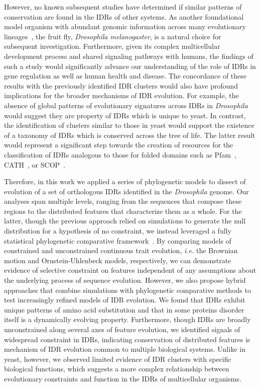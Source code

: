 However, no known subsequent studies have determined if similar patterns of conservation are found in the IDRs of other systems. As another foundational model organism with abundant genomic information across many evolutionary lineages~\cite{Yang2018, Miller2018, Kim2021, Gramates2022}, the fruit fly, \textit{Drosophila melanogaster}, is a natural choice for subsequent investigation. Furthermore, given its complex multicellular development process and shared signaling pathways with humans, the findings of such a study would significantly advance our understanding of the role of IDRs in gene regulation as well as human health and disease. The concordance of these results with the previously identified IDR clusters would also have profound implications for the broader mechanisms of IDR evolution. For example, the absence of global patterns of evolutionary signatures across IDRs in \textit{Drosophila} would suggest they are property of IDRs which is unique to yeast. In contrast, the identification of clusters similar to those in yeast would support the existence of a taxonomy of IDRs which is conserved across the tree of life. The latter result would represent a significant step towards the creation of resources for the classification of IDRs analogous to those for folded domains such as Pfam~\cite{Mistry2020}, CATH~\cite{Sillitoe2020}, or SCOP~\cite{Andreeva2013, Andreeva2019}.

Therefore, in this work we applied a series of phylogenetic models to dissect of evolution of a set of orthologous IDRs identified in the \textit{Drosophila} genome. Our analyses span multiple levels, ranging from the sequences that compose these regions to the distributed features that characterize them as a whole. For the latter, though the previous approach relied on simulations to generate the null distribution for a hypothesis of no constraint, we instead leveraged a fully statistical phylogenetic comparative framework~\cite{Cornwell2017}. By comparing models of constrained and unconstrained continuous trait evolution, \textit{i.e.} the Brownian motion and Ornstein-Uhlenbeck models, respectively, we can demonstrate evidence of selective constraint on features independent of any assumptions about the underlying process of sequence evolution. However, we also propose hybrid approaches that combine simulations with phylogenetic comparative methods to test increasingly refined models of IDR evolution. We found that IDRs exhibit unique patterns of amino acid substitution and that in some proteins disorder itself is a dynamically evolving property. Furthermore, though IDRs are broadly unconstrained along several axes of feature evolution, we identified signals of widespread constraint in IDRs, indicating conservation of distributed features is mechanism of IDR evolution common to multiple biological systems. Unlike in yeast, however, we observed limited evidence of IDR clusters with specific biological functions, which suggests a more complex relationship between evolutionary constraints and function in the IDRs of multicellular organisms.

